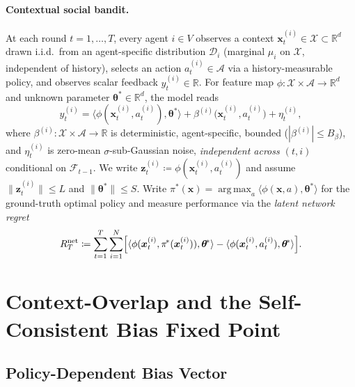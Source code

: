 \documentclass[11pt]{article}
\DeclareMathOperator*{\argmax}{arg\,max}
\begin{document}
\paragraph{Contextual social bandit.}
At each round $t=1,\dots,T$, every agent $i\in V$ observes a context
$\bm{x}_t^{(i)}\in\mathcal{X}\subset\mathbb{R}^d$ drawn i.i.d.\ from
an agent-specific distribution $\mathcal{D}_i$ (marginal $\mu_i$ on
$\mathcal{X}$, independent of history), selects an action
$a_t^{(i)}\in\mathcal{A}$ via a history-measurable policy, and
observes scalar feedback $y_t^{(i)}\in\mathbb{R}$.  For feature map
$\phi:\mathcal{X}\times\mathcal{A}\to\mathbb{R}^d$ and unknown
parameter $\bm{\theta}^{\!*}\in\mathbb{R}^d$, the model reads
\begin{equation}
y_t^{(i)}=\langle\phi(\bm{x}_t^{(i)},a_t^{(i)}),\bm{\theta}^{\!*}\rangle
+\beta^{(i)}\!\bigl(\bm{x}_t^{(i)},a_t^{(i)}\bigr)+\eta_t^{(i)},
\label{eq:observation_model}
\end{equation}
where $\beta^{(i)}:\mathcal{X}\times\mathcal{A}\to\mathbb{R}$ is
deterministic, agent-specific, bounded ($|\beta^{(i)}|\leq B_\beta$),
and $\eta_t^{(i)}$ is zero-mean $\sigma$-sub-Gaussian noise,
\emph{independent across $(t,i)$} conditional on
$\mathcal{F}_{t-1}$.  We write
$\bm{z}_t^{(i)}\coloneqq\phi(\bm{x}_t^{(i)},a_t^{(i)})$ and assume
$\|\bm{z}_t^{(i)}\|\leq L$ and $\|\bm{\theta}^{\!*}\|\leq S$.
Write $\pi^{\!*}(\bm{x})=\argmax_a\langle\phi(\bm{x},a),\bm{\theta}^{\!*}\rangle$
for the ground-truth optimal policy and measure performance via the
\emph{latent network regret}
\begin{equation}
R_T^{\mathrm{net}}\coloneqq\sum_{t=1}^T\sum_{i=1}^N
\Bigl[\langle\phi(\bm{x}_t^{(i)},\pi^{\!*}(\bm{x}_t^{(i)})),\bm{\theta}^{\!*}\rangle
-\langle\phi(\bm{x}_t^{(i)},a_t^{(i)}),\bm{\theta}^{\!*}\rangle\Bigr].
\label{eq:latent_regret}
\end{equation}

\section{Context-Overlap and the Self-Consistent Bias Fixed Point}
\label{sec:overlap}

\subsection{Policy-Dependent Bias Vector}
\end{document}
